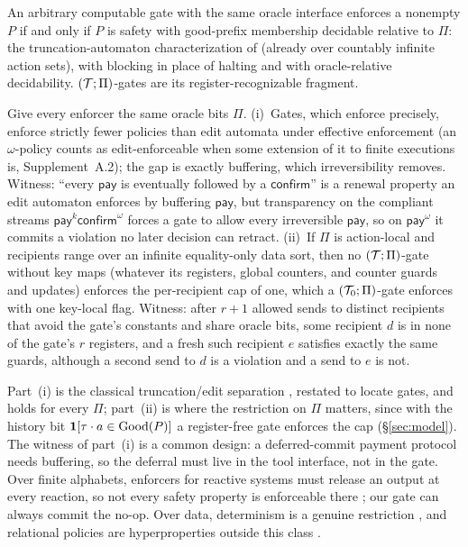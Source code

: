 \begin{remark}\label{rem:general-gates}
An arbitrary computable gate with the same oracle interface enforces a nonempty $P$ if and only
if $P$ is safety with good-prefix membership decidable relative to $\Pi$: the
truncation-automaton characterization of \citet{ligatti2005edit,ligatti2009nonsafety} (already over countably infinite action sets), with blocking in place of
halting and with oracle-relative decidability. $(\mathcal{T};\Pi)$-gates
are its register-recognizable fragment.
\end{remark}

\begin{proposition}\label{prop:strict}
Give every enforcer the same oracle bits $\Pi$.
(i)~Gates, which enforce precisely, enforce strictly fewer policies than edit automata under effective
enforcement \citep{ligatti2005edit} (an $\omega$-policy counts as edit-enforceable when some extension of it to
finite executions is, Supplement~A.2); the gap is exactly buffering, which irreversibility removes. Witness: ``every $\mathsf{pay}$ is eventually followed by a
$\mathsf{confirm}$'' is a renewal property an edit automaton enforces by buffering
$\mathsf{pay}$, but transparency on the compliant streams $\mathsf{pay}^{k}\mathsf{confirm}^{\omega}$
forces a gate to allow every irreversible $\mathsf{pay}$, so on $\mathsf{pay}^{\omega}$ it
commits a violation no later decision can retract.
(ii)~If $\Pi$ is action-local and recipients range over an infinite equality-only data sort, then no
$(\mathcal{T};\Pi)$-gate without key maps (whatever its registers, global counters, and counter guards and
updates) enforces the per-recipient cap of one, which a $(\mathcal{T}_0;\Pi)$-gate enforces with one key-local
flag. Witness: after $r{+}1$ allowed sends to distinct recipients that avoid the gate's constants and
share oracle bits, some recipient $d$ is in none of the gate's $r$ registers, and a fresh such recipient
$e$ satisfies exactly the same guards, although a second send to $d$ is a violation and a send to $e$ is
not.
\end{proposition}

Part~(i) is the classical truncation/edit separation \citep{ligatti2005edit,ligatti2009nonsafety},
restated to locate gates, and holds for every $\Pi$; part~(ii) is where the restriction on $\Pi$ matters,
since with the history bit $\mathbf{1}[\tau\cdot a\in\mathrm{Good}(P)]$ a register-free gate enforces the cap
(\S\ref{sec:model}). The witness of part~(i) is a common design: a deferred-commit payment protocol
needs buffering, so the deferral must live in the tool interface, not in the gate. Over finite
alphabets, enforcers for reactive systems must release an output at every reaction, so not every safety property
is enforceable there \citep{pinisetty2017synchronous,anand2025prompt}; our gate can always commit
the no-op. Over data, determinism is a genuine restriction \citep{aceto2025monitorability}, and
relational policies are hyperproperties outside this class
\citep{clarkson2010hyperproperties,pandey2026local}.

